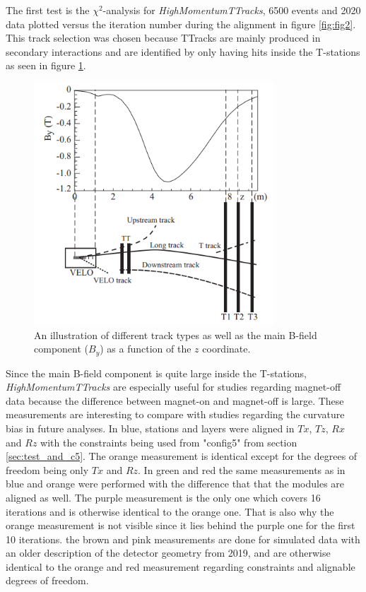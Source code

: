The first test is the $\chi^2$-analysis for \textit{HighMomentumTTracks},
6500 events and 2020 data plotted versus the iteration number during the
alignment in figure \ref{fig:fig2}.
This track selection was chosen because TTracks are mainly produced in secondary interactions and are identified by only having hits inside the T-stations as seen in figure \ref{fig:tracksel}.
\begin{figure}[!ht]
    \centering
    \includegraphics[width=0.8\textwidth]{plots/track_selection.png}
    \caption{An illustration of different track types as well as the main B-field component ($B_y$) as a function of the $z$ coordinate.}
    \label{fig:tracksel}
\end{figure}
Since the main B-field component is quite large inside the T-stations, \textit{HighMomentumTTracks} are especially useful for studies regarding magnet-off data because the difference between magnet-on and magnet-off is large.
These measurements are interesting to compare with studies regarding the curvature bias in future analyses.
In blue, stations and layers were aligned in $Tx$,
$Tz$, $Rx$ and $Rz$ with the constraints being used from "config5" from section \ref{sec:test_and_c5}. The orange
measurement is identical except for the degrees of freedom being only $Tx$ and $Rz$.
In green and red the same measurements as in blue and orange were performed with
the difference that that the modules are aligned as well.
The purple measurement is the only one which covers 16 iterations and is otherwise identical to the orange one. That is also why the orange measurement is not visible since it lies behind the purple one for the first 10 iterations.
the brown and pink measurements are done for simulated data with an older description of the detector geometry from 2019, and are otherwise identical to the orange and red measurement regarding constraints and alignable degrees of freedom.


